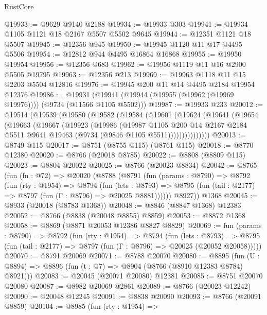 \begin{lexlean}{RustCore}
\begin{coremodule}
@19933 := @9629 @9140 @2188
@19934 := @19933 @303
@19941 := @19934 @1105 @1121 @18 @2167 @5507 @5502 @9645
@19944 := @12351 @1121 @18 @5507
@19945 := @12356 @945
@19950 := @19945 @1120 @11 @17 @4495 @5506
@19954 := @12812 @944 @4495 @16864 @16868
@19955 := @19950 @19954
@19956 := @12356 @683
@19962 := @19956 @1119 @11 @16 @2900 @5505 @19795
@19963 := @12356 @213
@19969 := @19963 @1118 @11 @15 @2203 @5504 @12816
@19976 := @19945 @200 @11 @14 @4495 @2184 @19954 @12376
@19986 := @19931 (@19941 (@19944 (@19955 (@19962 (@19969 @19976)))) (@9734 (@11566 @1105 @5502)))
@19987 := @19933 @233
@20012 := @19514
    (@19539
      (@19580
        (@19582
          (@19584
            (@19601
              (@19624
                (@19641
                  (@19654
                    (@19663
                      (@19667
                        (@19923
                          (@19986
                            (@19987
                              @1105
                              @200
                              @14
                              @2167
                              @2184
                              @5511
                              @9641
                              @19463
                              (@9734 (@9846 @1105 @5511)))))))))))))))
@20013 := @8749 @115
@20017 := @8751 (@8755 @115) (@8761 @115)
@20018 := @8770 @12380
@20020 := @8766 (@20018 @8785)
@20022 := @8808 (@8809 @115)
@20023 := @8804 @20022
@20025 := @8766 (@20023 @8834)
@20042 := @8765
    (fun (fn : @72) =>
    @20020
      (@8788
        (@8791
          (fun (params : @8790) =>
          @8792
            (fun (rty : @1954) =>
            @8794
              (fun (lets : @8793) =>
              @8795 (fun (tail : @2177) => @8797 (fun (Γ : @8796) => @20025 @8881))))))
        @8927))
    @1368
@20045 := @8933 (@20018 (@8783 @1368))
@20048 := @8846 (@8847 @1368) @12383
@20052 := @8766 (@8838 (@20048 @8855) @8859)
@20053 := @8872 @1368
@20058 := @8869 (@8871 @20053 @12386 @8827 @8829)
@20069 := fun (params : @8790) =>
  @8792
    (fun (rty : @1954) =>
    @8794
      (fun (lets : @8793) =>
      @8795 (fun (tail : @2177) => @8797 (fun (Γ : @8796) => @20025 (@20052 @20058)))))
@20070 := @8791 @20069
@20071 := @8788 @20070
@20080 := @8895
    (fun (U : @8894) => @8896 (fun (t : @7) => @8904 (@8766 (@8910 @12383 @8784) @8921)))
@20083 := @20045 (@20071 @20080) @12381
@20085 := @8751 @20070 @20080
@20087 := @8982 @20069 @2861
@20089 := @8766 (@20023 @12242)
@20090 := @20048 @12245
@20091 := @8838 @20090
@20093 := @8766 (@20091 @8859)
@20104 := @8985
    (fun (rty : @1954) =>

\end{coremodule}
\end{lexlean}
